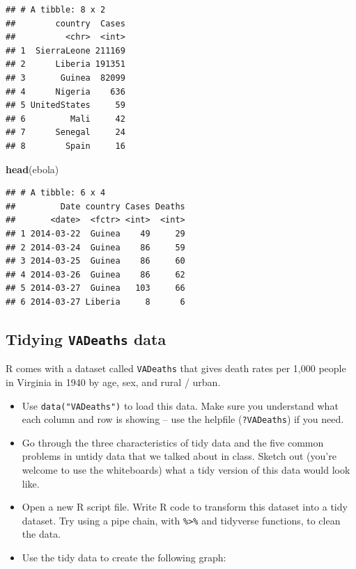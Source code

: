 \documentclass[]{book}
\makeatletter
\newenvironment{Shaded}{\begin{snugshade}}{\end{snugshade}}
\newcommand{\KeywordTok}[1]{\textcolor[rgb]{0.13,0.29,0.53}{\textbf{#1}}}
\newcommand{\NormalTok}[1]{#1}
\providecommand{\tightlist}{%
  \setlength{\itemsep}{0pt}\setlength{\parskip}{0pt}}
\newenvironment{kframe}{%
\medskip{}
\setlength{\fboxsep}{.8em}
 \def\at@end@of@kframe{}%
 \ifinner\ifhmode%
  \def\at@end@of@kframe{\end{minipage}}%
  \begin{minipage}{\columnwidth}%
 \fi\fi%
 \def\FrameCommand##1{\hskip\@totalleftmargin \hskip-\fboxsep
 \colorbox{shadecolor}{##1}\hskip-\fboxsep
     \hskip-\linewidth \hskip-\@totalleftmargin \hskip\columnwidth}%
 \MakeFramed {\advance\hsize-\width
   \@totalleftmargin\z@ \linewidth\hsize
   \@setminipage}}%
 {\par\unskip\endMakeFramed%
 \at@end@of@kframe}
\renewenvironment{Shaded}{\begin{kframe}}{\end{kframe}}
\theoremstyle{definition}
\theoremstyle{definition}
\theoremstyle{definition}
\theoremstyle{remark}
\makeatother
\begin{document}
\begin{verbatim}
## # A tibble: 8 x 2
##        country  Cases
##          <chr>  <int>
## 1  SierraLeone 211169
## 2      Liberia 191351
## 3       Guinea  82099
## 4      Nigeria    636
## 5 UnitedStates     59
## 6         Mali     42
## 7      Senegal     24
## 8        Spain     16
\end{verbatim}

\begin{Shaded}
\begin{Highlighting}[]
\KeywordTok{head}\NormalTok{(ebola)}
\end{Highlighting}
\end{Shaded}

\begin{verbatim}
## # A tibble: 6 x 4
##         Date country Cases Deaths
##       <date>  <fctr> <int>  <int>
## 1 2014-03-22  Guinea    49     29
## 2 2014-03-24  Guinea    86     59
## 3 2014-03-25  Guinea    86     60
## 4 2014-03-26  Guinea    86     62
## 5 2014-03-27  Guinea   103     66
## 6 2014-03-27 Liberia     8      6
\end{verbatim}

\subsection{\texorpdfstring{Tidying \texttt{VADeaths}
data}{Tidying VADeaths data}}\label{tidying-vadeaths-data}

R comes with a dataset called \texttt{VADeaths} that gives death rates
per 1,000 people in Virginia in 1940 by age, sex, and rural / urban.

\begin{itemize}
\tightlist
\item
  Use \texttt{data("VADeaths")} to load this data. Make sure you
  understand what each column and row is showing -- use the helpfile
  (\texttt{?VADeaths}) if you need.
\item
  Go through the three characteristics of tidy data and the five common
  problems in untidy data that we talked about in class. Sketch out
  (you're welcome to use the whiteboards) what a tidy version of this
  data would look like.
\item
  Open a new R script file. Write R code to transform this dataset into
  a tidy dataset. Try using a pipe chain, with
  \texttt{\%\textgreater{}\%} and tidyverse functions, to clean the
  data.
\item
  Use the tidy data to create the following graph:
\end{itemize}
\end{document}
